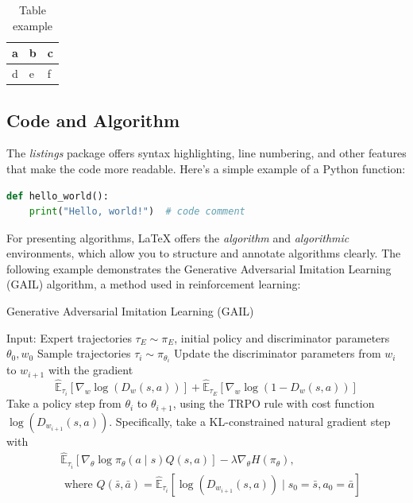 \begin{table}[h!]
\centering
\begin{tabular}{|l|l|l|}
\hline
a & b & c \\ \hline
d & e & f \\ \hline
\end{tabular}
\caption{Table example}
\label{tab1}
\end{table}

\subsection{Code and Algorithm}
The \textit{listings} package offers syntax highlighting, line numbering, and other features that make the code more readable. Here’s a simple example of a Python function:

\begin{lstlisting}[language=Python]
def hello_world():
    print("Hello, world!")  # code comment
\end{lstlisting}

For presenting algorithms, LaTeX offers the \textit{algorithm} and \textit{algorithmic} environments, which allow you to structure and annotate algorithms clearly. The following example demonstrates the Generative Adversarial Imitation Learning (GAIL) algorithm, a method used in reinforcement learning:

\begin{algorithm}
    \caption{Generative Adversarial Imitation Learning (GAIL)}
    \label{alg1}
    \begin{algorithmic}[1]
    \State Input: Expert trajectories $\tau_E \sim \pi_E$, initial policy and discriminator parameters $\theta_0, w_0$
        \State Sample trajectories $\tau_i \sim \pi_{\theta_i}$
        \State Update the discriminator parameters from $w_i$ to $w_{i+1}$ with the gradient
        $$
            \hat{\mathbb{E}}_{\tau_i}\left[\nabla_w \log \left(D_w(s, a)\right)\right]+\hat{\mathbb{E}}_{\tau_E}\left[\nabla_w \log \left(1-D_w(s, a)\right)\right]
        $$
        \State Take a policy step from $\theta_i$ to $\theta_{i+1}$, using the TRPO rule with cost function $\log \left(D_{w_{i+1}}(s, a)\right)$. Specifically, take a KL-constrained natural gradient step with
        \begin{align*}
            & \hat{\mathbb{E}}_{\tau_i}\left[\nabla_\theta \log \pi_\theta(a \mid s) Q(s, a)\right]-\lambda \nabla_\theta H\left(\pi_\theta\right), \\
            & \text { where } Q(\bar{s}, \bar{a})=\hat{\mathbb{E}}_{\tau_i}\left[\log \left(D_{w_{i+1}}(s, a)\right) \mid s_0=\bar{s}, a_0=\bar{a}\right]
        \end{align*}
    \EndFor
    \end{algorithmic}
\end{algorithm}


